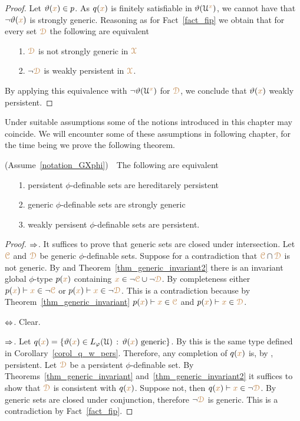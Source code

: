 \begin{proof}
  Let $\vartheta({\color{brown} x})\in p$.
  As $q({\color{brown} x})$ is finitely satisfiable in $\vartheta(\EuScript U^{\color{brown} x})$, we cannot have that $\neg\vartheta({\color{brown} x})$ is strongly generic.
  Reasoning as for Fact~\ref{fact_fip} we obtain that for every set ${\color{brown}\EuScript D}$ the following are equivalent
  \begin{itemize}
    \item[1.] ${\color{brown}\EuScript D}$ is not strongly generic in ${\color{brown}\EuScript X}$
    \item[2.] $\neg{\color{brown}\EuScript D}$ is weakly persistent in ${\color{brown}\EuScript X}$.
  \end{itemize}
  By applying this equivalence with $\neg\vartheta(\EuScript U^{\color{brown} x})$ for ${\color{brown}\EuScript D}$, we conclude that $\vartheta({\color{brown} x})$ weakly persistent.
\end{proof}

Under suitable assumptions some of the notions introduced in this chapter may coincide.
We will encounter some of these assumptions in following chapter, for the time being we prove the following theorem.

\begin{theorem}
  (Assume~\ref{notation_GXphi})\ \  
  The following are equivalent
  \begin{itemize}
    \item[1.] persistent $\phi$-definable sets are hereditarely persistent
    \item[2.] generic $\phi$-definable sets are strongly generic
    \item[3.] weakly persisent $\phi$-definable sets are persistent.
  \end{itemize}
\end{theorem}

\begin{proof}
  $\Rightarrow$.
  It suffices to prove that generic sets are closed under intersection.
  Let ${\color{brown}\EuScript C}$ and ${\color{brown}\EuScript D}$ be generic $\phi$-definable sets.
  Suppose for a contradiction that ${\color{brown}\EuScript C}\cap{\color{brown}\EuScript D}$ is not generic.
  By \ssf1 and Theorem~\ref{thm_generic_invariant2} there is an invariant global $\phi$-type $p({\color{brown} x})$ containing ${\color{brown} x}\in\neg{\color{brown}\EuScript C}\cup\neg{\color{brown}\EuScript D}$.
  By completeness either $p({\color{brown} x})\vdash{\color{brown}x}\in\neg{\color{brown}\EuScript C}$ or $p({\color{brown} x})\vdash{\color{brown}x}\in\neg{\color{brown}\EuScript D}$.
  This is a contradiction because by Theorem~\ref{thm_generic_invariant} $p({\color{brown} x})\vdash{\color{brown}x}\in{\color{brown}\EuScript C}$ and $p({\color{brown} x})\vdash{\color{brown}x}\in{\color{brown}\EuScript D}$.

  $\Leftrightarrow$. Clear.

  $\Rightarrow$.
  Let $q({\color{brown} x})=\{\vartheta({\color{brown} x})\in L_\varphi(\EuScript U)\,:\,\vartheta({\color{brown} x})\textrm{ generic}\}$.
  By \ssf2 this is the same type defined in Corollary~\ref{corol_q_w_pers}.
  Therefore, any completion of $q({\color{brown} x})$ is, by \ssf3, persistent.
  Let ${\color{brown}\EuScript D}$ be a persistent $\phi$-definable set.
  By Theorems~\ref{thm_generic_invariant} and~\ref{thm_generic_invariant2} it suffices to show that ${\color{brown}\EuScript D}$ is consistent with $q({\color{brown} x})$.
  Suppose not, then $q({\color{brown} x})\vdash {\color{brown}x}\in\neg{\color{brown}\EuScript D}$.
  By  generic sets are closed under conjunction, therefore $\neg{\color{brown}\EuScript D}$ is generic.
  This is a contradiction by Fact~\ref{fact_fip}.
\end{proof}

